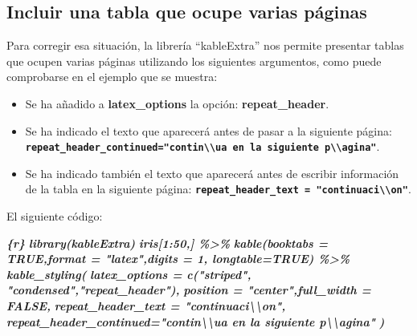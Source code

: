 \documentclass[12pt,a4paper,oneside,]{book}
\newenvironment{Shaded}{\begin{snugshade}}{\end{snugshade}}
\newcommand{\InformationTok}[1]{\textcolor[rgb]{0.56,0.35,0.01}{\textbf{\textit{#1}}}}
\numberwithin{dummy}{section}
\theoremstyle{ocrenumbox}
\theoremstyle{blacknumex}
\theoremstyle{blacknumbox}
\theoremstyle{ocrenum}
\theoremstyle{ocrenum}
\begin{document}
\hypertarget{incluir-una-tabla-que-ocupe-varias-puxe1ginas}{%
\subsection{Incluir una tabla que ocupe varias
páginas}\label{incluir-una-tabla-que-ocupe-varias-puxe1ginas}}

Para corregir esa situación, la librería ``kableExtra'' nos permite
presentar tablas que ocupen varias páginas utilizando los siguientes
argumentos, como puede comprobarse en el ejemplo que se muestra:

\begin{itemize}
\item
  Se ha añadido a \textbf{latex\_options} la opción:
  \textbf{repeat\_header}.
\item
  Se ha indicado el texto que aparecerá antes de pasar a la siguiente
  página:
  \textbf{\texttt{repeat\_header\_continued="contin\textbackslash{}\textbackslash{}\textquotesingle{}ua\ en\ la\ siguiente\ p\textbackslash{}\textbackslash{}\textquotesingle{}agina"}}.
\item
  Se ha indicado también el texto que aparecerá antes de escribir
  información de la tabla en la siguiente página:
  \textbf{\texttt{repeat\_header\_text\ =\ "continuaci\textbackslash{}\textbackslash{}\textquotesingle{}on"}}.
\end{itemize}

El siguiente código:

\begin{Shaded}
\begin{Highlighting}[]
\InformationTok{\textasciigrave{}\textasciigrave{}\textasciigrave{}\{r\}}
\InformationTok{library(kableExtra) }
\InformationTok{iris[1:50,] \%\textgreater{}\% }
\InformationTok{  kable(booktabs = TRUE,format = "latex",digits = 1, longtable=TRUE) \%\textgreater{}\%}
\InformationTok{  kable\_styling(}
\InformationTok{   latex\_options = c("striped", "condensed","repeat\_header"), }
\InformationTok{   position = "center",full\_width = FALSE,}
\InformationTok{   repeat\_header\_text = "continuaci\textbackslash{}\textbackslash{}\textquotesingle{}on", }
\InformationTok{   repeat\_header\_continued="contin\textbackslash{}\textbackslash{}\textquotesingle{}ua en la siguiente p\textbackslash{}\textbackslash{}\textquotesingle{}agina"}
\InformationTok{  )}
\InformationTok{\textasciigrave{}\textasciigrave{}\textasciigrave{}}
\end{Highlighting}
\end{Shaded}
\end{document}
